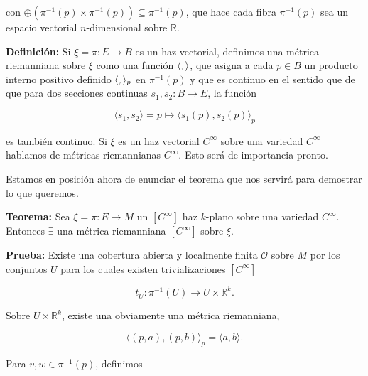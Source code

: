 \documentclass[a4paper,10pt]{article}
\numberwithin{equation}{section}
\newcommand{\definicion}{\textbf{Definición: }}
\newcommand{\teorema}{\textbf{Teorema: }}
\newcommand{\prueba}{\textbf{Prueba: }}
\begin{document}
con $\oplus(\pi^{-1}(p) \times \pi^{-1}(p)) \subseteq \pi^{-1}(p)$, que hace 
cada fibra $\pi^{-1}(p)$ sea un espacio vectorial $n$-dimensional sobre 
$\mathbb{R}$.

\vspace{.3cm}

\definicion Si $\xi = \pi: E \rightarrow B$ es un haz vectorial, definimos 
una métrica riemanniana sobre $\xi$ como una función $\langle \space, \space \rangle$, 
que asigna a cada $p \in B$ un producto interno positivo definido $\langle \space, \space \rangle_p$
en $\pi^{-1}(p)$ y que es continuo en el sentido que de que para dos secciones continuas 
$s_1,s_2: B \rightarrow E$, la función

\begin{equation}
 \langle s_1, s_2 \rangle = p \mapsto \langle s_1(p), s_2(p) \rangle_p
\end{equation}

es también continuo. Si $\xi$ es un haz vectorial $C^\infty$ sobre una variedad 
$C^\infty$ hablamos de métricas riemannianas $C^\infty$. Esto será de importancia pronto.

\vspace{.3cm}

Estamos en posición ahora de enunciar el teorema que nos servirá para 
demostrar lo que queremos.

\vspace{.3cm}

\teorema Sea $\xi = \pi: E \rightarrow M$ un $[C^\infty]$ haz $k$-plano
sobre una variedad $C^\infty$. Entonces $\exists$ una métrica riemanniana 
$[C^\infty]$ sobre $\xi$.

\vspace{.3cm}

\prueba Existe una cobertura abierta y localmente finita $\mathcal{O}$ sobre 
$M$ por los conjuntos $U$ para los cuales existen trivializaciones $[C^\infty]$

\begin{equation}
 t_U: \pi^{-1}(U) \rightarrow U \times \mathbb{R}^k.
\end{equation}

Sobre $U \times \mathbb{R}^k$, existe una obviamente una métrica riemanniana,

\begin{equation}
 \langle (p,a), (p,b)\rangle_p = \langle a, b \rangle. 
\end{equation}

Para $v,w \in \pi^{-1}(p)$, definimos
\end{document}
